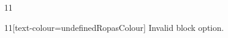 \documentclass[paper=A4]{ropas-poster}
\begin{document}
\begin{postergrid}{1}{1}
\begin{posterblock}{1}{1}[text-colour=undefinedRopasColour]
Invalid block option.
\end{posterblock}
\end{postergrid}
\end{document}

